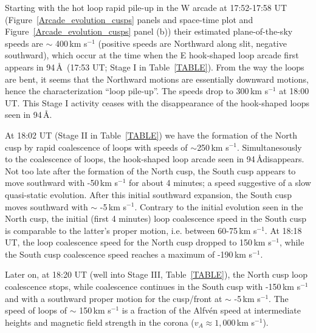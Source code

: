 \documentclass[preprint]{aastex}
\begin{document}
Starting with the hot loop rapid pile-up in the W arcade at 17:52-17:58 UT (Figure~\ref{Arcade_evolution_cusps} panels and space-time plot and Figure~\ref{Arcade_evolution_cusps} panel (b)) their estimated plane-of-the-sky speeds are $\sim$ 400\,km s$^{-1}$ (positive speeds are Northward along slit, negative southward), which occur at the time when the E hook-shaped loop arcade first appears in 94\,\AA\ (17:53 UT; Stage I in Table~\ref{TABLE}). From the way the loops are bent, it seems that the Northward motions are essentially downward motions, hence the characterization ``loop pile-up''. The speeds drop to 300\,km s$^{-1}$ at 18:00 UT. This Stage I activity ceases with the disappearance of the hook-shaped loops seen in 94\,\AA. 

At 18:02 UT (Stage II in Table~\ref{TABLE}) we have the formation of the North cusp by rapid coalescence of loops with speeds of  $\sim$250\,km s$^{-1}$. Simultanesously to the coalescence of loops, the hook-shaped loop arcade seen in 94\,\AA disappears. Not too late after the formation of the North cusp, the South cusp appears to move southward with -50\,km s$^{-1}$ for about 4 minutes; a speed suggestive of a slow quasi-static evolution. After this initial southward expansion, the South cusp moves southward with $\sim$ -5\,km s$^{-1}$. Contrary to the initial evolution seen in the North cusp, the initial (first 4 minutes) loop coalescence speed in the South cusp is comparable to the latter's proper motion, i.e. between 60-75\,km s$^{-1}$. At 18:18 UT, the loop coalescence speed for the North cusp dropped to 150\,km s$^{-1}$, while the South cusp coalescence speed reaches a maximum of -190\,km s$^{-1}$. 

Later on, at 18:20 UT (well into Stage III, Table~\ref{TABLE}), the North cusp loop coalescence stops, while coalescence continues in the South cusp with -150\,km s$^{-1}$ and with a southward proper motion for the cusp/front at $\sim$ -5\,km s$^{-1}$. The speed of loops of $\sim$ 150\,km s$^{-1}$ is a fraction of the Alfv\'{e}n speed at intermediate heights and magnetic field strength in the corona ($v_A\approx1,000$\,km s$^{-1}$).
\end{document}
